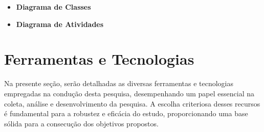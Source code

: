 \begin{itemize}
\begin{itemize}
\begin{center}
    \label{fig:nome-da-imagem}
\end{center}
        \item \textbf{Diagrama de Classes}
        \item \textbf{Diagrama de Atividades}
    \end{itemize}
\end{itemize}

\section{Ferramentas e Tecnologias}

Na presente seção, serão detalhadas as diversas ferramentas e tecnologias empregadas na condução desta pesquisa, desempenhando um papel essencial na coleta, análise e desenvolvimento da pesquisa. A escolha criteriosa desses recursos é fundamental para a robustez e eficácia do estudo, proporcionando uma base sólida para a consecução dos objetivos propostos.

